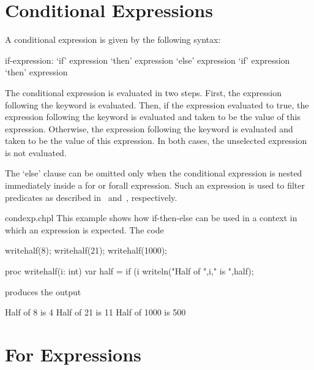 \section{Conditional Expressions}
\label{Conditional_Expressions}

A conditional expression is given by the following syntax:
\begin{syntax}
if-expression:
  `if' expression `then' expression `else' expression
  `if' expression `then' expression
\end{syntax}
The conditional expression is evaluated in two steps.  First, the
expression following the  keyword is evaluated.  Then, if the
expression evaluated to true, the expression following the 
keyword is evaluated and taken to be the value of this expression.
Otherwise, the expression following the  keyword is
evaluated and taken to be the value of this expression.  In both
cases, the unselected expression is not evaluated.

The `else' clause can be omitted only when the conditional expression
is nested immediately inside a for or forall expression.  Such an expression
is used to filter predicates as described
in~ and~,
respectively.

\begin{chapelexample}{condexp.chpl}
This example shows how if-then-else can be used in a context in which an
expression is expected.  The code
\begin{chapel}
writehalf(8);
writehalf(21);
writehalf(1000);

proc writehalf(i: int) {
  var half = if (i %
  writeln("Half of ",i," is ",half); 
}
\end{chapel}
produces the output
\begin{chapelprintoutput}{}
Half of 8 is 4
Half of 21 is 11
Half of 1000 is 500
\end{chapelprintoutput}
\end{chapelexample}

\section{For Expressions}
\label{For_Expressions}

